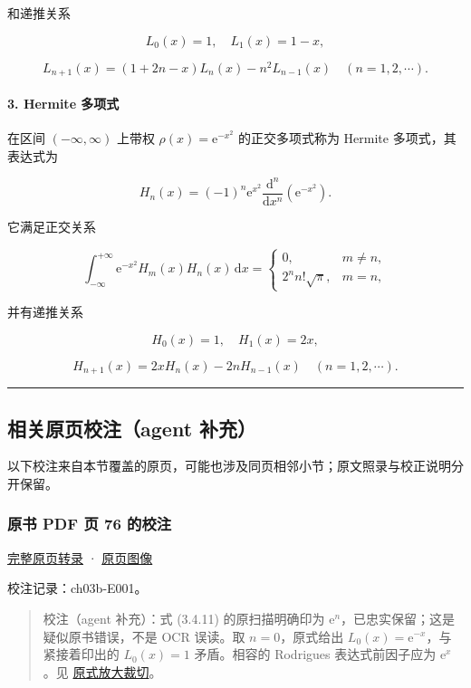 \documentclass[
  10pt,
  fontset=fandol]{ctexart}
\begin{document}
和递推关系

\[
L_0(x)=1,\quad L_1(x)=1-x,
\]

\[
L_{n+1}(x)=(1+2n-x)L_n(x)-n^2L_{n-1}(x)\quad(n=1,2,\cdots).
\]

\paragraph{3. Hermite 多项式}\label{hermite-ux591aux9879ux5f0f}

在区间 \((-\infty,\infty)\) 上带权 \(\rho(x)=\mathrm e^{-x^2}\) 的正交多项式称为 Hermite 多项式，其表达式为

\[
H_n(x)=(-1)^n\mathrm e^{x^2}\frac{\mathrm d^n}{\mathrm dx^n}(\mathrm e^{-x^2}).\tag{3.4.12}
\]

它满足正交关系

\[
\int_{-\infty}^{+\infty}\mathrm e^{-x^2}H_m(x)H_n(x)\,\mathrm dx=
\begin{cases}
0,&m\ne n,\\
2^nn!\sqrt\pi,&m=n,
\end{cases}
\]

并有递推关系

\[
H_0(x)=1,\quad H_1(x)=2x,
\]

\[
H_{n+1}(x)=2xH_n(x)-2nH_{n-1}(x)\quad(n=1,2,\cdots).
\]

\begin{center}\rule{0.5\linewidth}{0.5pt}\end{center}

\subsection{相关原页校注（agent 补充）}\label{ux76f8ux5173ux539fux9875ux6821ux6ce8agent-ux8865ux5145}

以下校注来自本节覆盖的原页，可能也涉及同页相邻小节；原文照录与校正说明分开保留。

\subsubsection{原书 PDF 页 76 的校注}\label{ux539fux4e66-pdf-ux9875-76-ux7684ux6821ux6ce8}

\href{../pages/pdf-076.md}{完整原页转录} · \href{../../source-images/pdf-076.jpeg}{原页图像}

校注记录：ch03b-E001。

\begin{quote}
校注（agent 补充）：式 (3.4.11) 的原扫描明确印为 \(\mathrm e^n\)，已忠实保留；这是疑似原书错误，不是 OCR 误读。取 \(n=0\)，原式给出 \(L_0(x)=\mathrm e^{-x}\)，与紧接着印出的 \(L_0(x)=1\) 矛盾。相容的 Rodrigues 表达式前因子应为 \(\mathrm e^x\)。见 \href{../assets/ch03b/p076-laguerre-formula.png}{原式放大裁切}。
\end{quote}
\end{document}
